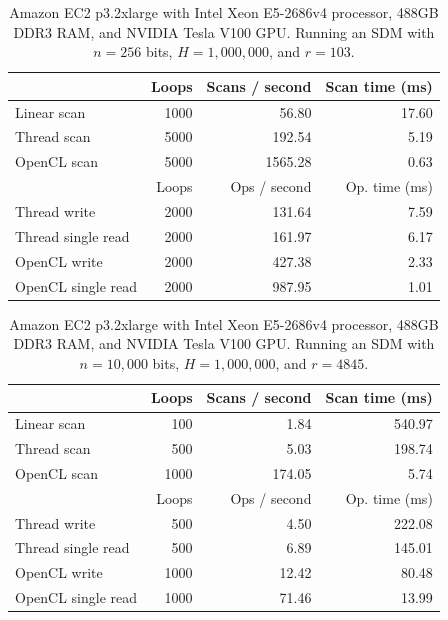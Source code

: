 \begin{table}[!htb]
\centering
\begin{tabular}{| l | r | r | r |}
    \hline
    & Loops & Scans / second & Scan time (ms) \\ \hline
    Linear scan & 1000 & 56.80 & 17.60 \\
    Thread scan & 5000 & 192.54 & 5.19 \\
    OpenCL scan & 5000 & 1565.28 & 0.63 \\ \hline
    \hline
    & Loops & Ops / second & Op. time (ms) \\ \hline
    Thread write & 2000 & 131.64 & 7.59 \\
    Thread single read & 2000 & 161.97 & 6.17 \\
    OpenCL write & 2000 & 427.38 & 2.33 \\
    OpenCL single read & 2000 & 987.95 & 1.01 \\
    \hline
\end{tabular}
\caption{Amazon EC2 p3.2xlarge with Intel Xeon E5-2686v4 processor, 488GB DDR3 RAM, and NVIDIA Tesla V100 GPU. Running an SDM with $n=256$ bits, $H=1,000,000$, and $r=103$.}
\end{table}

\begin{table}[!htb]
\centering
\begin{tabular}{| l | r | r | r |}
    \hline
    & Loops & Scans / second & Scan time (ms) \\ \hline
    Linear scan & 100 & 1.84 & 540.97 \\
    Thread scan & 500 & 5.03 & 198.74 \\
    OpenCL scan & 1000 & 174.05 & 5.74 \\ \hline
    \hline
    & Loops & Ops / second & Op. time (ms) \\ \hline
    Thread write & 500 & 4.50 & 222.08 \\
    Thread single read & 500 & 6.89 & 145.01 \\
    OpenCL write & 1000 & 12.42 & 80.48 \\
    OpenCL single read & 1000 & 71.46 & 13.99 \\
    \hline
\end{tabular}
\caption{Amazon EC2 p3.2xlarge with Intel Xeon E5-2686v4 processor, 488GB DDR3 RAM, and NVIDIA Tesla V100 GPU. Running an SDM with $n=10,000$ bits, $H=1,000,000$, and $r=4845$.}
\end{table}
